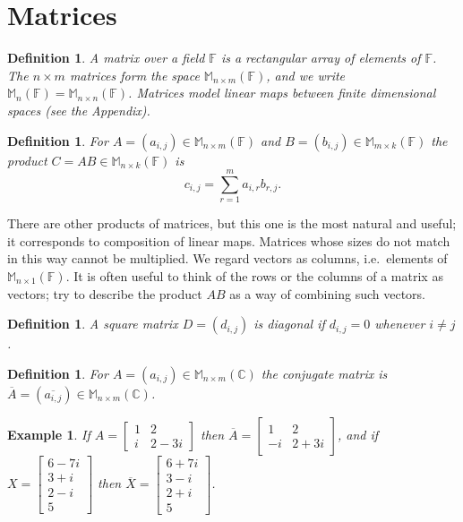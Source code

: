 \documentclass[12pt]{article}
\theoremstyle{breakplain}
\theoremstyle{breakdef}
\newtheorem{definition}[theorem]{Definition}
\newtheorem*{example}{Example}
\theoremstyle{remark}
\begin{document}
\newpage
\section{Matrices}
\begin{definition}
    A matrix over a field $\mathbb{F}$ is a rectangular array of elements of $\mathbb{F}$. The $n\times m$ matrices form the space $\mathbb{M}_{n\times m}(\mathbb{F})$, and we write $\mathbb{M}_n(\mathbb{F})=\mathbb{M}_{n\times n}(\mathbb{F})$. Matrices model linear maps between finite dimensional spaces (see the Appendix).
\end{definition}
\begin{definition}
    For $A=(a_{i,j})\in\mathbb{M}_{n\times m}(\mathbb{F})$ and $B=(b_{i,j})\in\mathbb{M}_{m\times k}(\mathbb{F})$ the \emph{product} $C=AB\in\mathbb{M}_{n\times k}(\mathbb{F})$ is
    \[c_{i,j}=\sum_{r=1}^m a_{i,r}b_{r,j}.\]
\end{definition}
There are other products of matrices, but this one is the most natural and useful; it corresponds to composition of linear maps. Matrices whose sizes do not match in this way cannot be multiplied.
We regard vectors as columns, i.e.\ elements of $\mathbb{M}_{n\times 1}(\mathbb{F})$.
It is often useful to think of the rows or the columns of a matrix as vectors; try to describe the product $AB$ as a way of combining such vectors.
\begin{definition}
    A square matrix $D=(d_{i,j})$ is \emph{diagonal} if $d_{i,j}=0$ whenever $i\neq j$.
\end{definition}
\begin{definition}
    For $A=(a_{i,j})\in\mathbb{M}_{n\times m}(\mathbb{C})$ the \emph{conjugate matrix} is $\overline{A}=(\overline{a_{i,j}})\in\mathbb{M}_{n\times m}(\mathbb{C})$.
\end{definition}
\begin{example}
    If $A=\begin{bmatrix}
        1 & 2 \\
        i & 2-3i
    \end{bmatrix}$ then $\overline{A}=\begin{bmatrix}
        1 & 2 \\
        -i & 2+3i
    \end{bmatrix}$, and if $X=\begin{bmatrix}
        6-7i \\ 3+i \\ 2-i \\ 5
    \end{bmatrix}$ then $\overline{X}=\begin{bmatrix}
        6+7i \\ 3-i \\ 2+i \\ 5
    \end{bmatrix}$.
\end{example}
\end{document}
